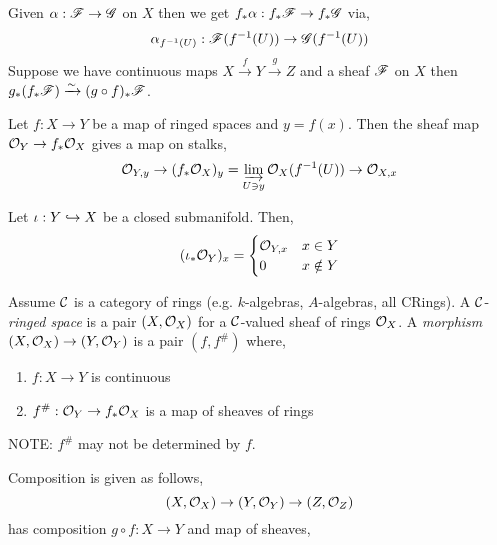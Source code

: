 \documentclass[12pt]{article}
\begin{document}
\begin{rmk}
Given $\alpha : \mathscr{F} \to \mathscr{G}$ on $X$ then we get $f_* \alpha : f_* \mathscr{F} \to f_* \mathscr{G}$ via,
\[ \alpha_{f^{-1}(U)} : \mathscr{F}(f^{-1}(U)) \to \mathscr{G}(f^{-1}(U)) \]
Suppose we have continuous maps $X \xrightarrow{f} Y \xrightarrow{g} Z$ and a sheaf $\mathscr{F}$ on $X$ then $g_* (f_* \mathscr{F}) \xrightarrow{\sim} (g \circ f)_* \mathscr{F}$.
\end{rmk}

\begin{example}
Let $f : X \to Y$ be a map of ringed spaces and $y = f(x)$. Then the sheaf map $\mathcal{O}_{Y} \to f_* \mathcal{O}_{X}$ gives a map on stalks,
\[ \mathcal{O}_{Y, y} \to (f_* \mathcal{O}_{X})_y = \varinjlim_{U \ni y} \mathcal{O}_{X}(f^{-1}(U)) \to \mathcal{O}_{X, x} \]
\end{example}

\begin{example}
Let $\iota : Y \hookrightarrow X$ be a closed submanifold. Then,
\[ (\iota_* \mathcal{O}_{Y})_x = 
\begin{cases}
\mathcal{O}_{Y, x} & x \in Y 
\\
0 & x \notin Y
\end{cases} \]
\end{example}

\begin{defn}
Assume $\mathcal{C}$ is a category of rings (e.g. $k$-algebras, $A$-algebras, all CRings). A $\mathcal{C}$-\textit{ringed space} is a pair $(X, \mathcal{O}_{X})$ for a $\mathcal{C}$-valued sheaf of rings $\mathcal{O}_{X}$. A \textit{morphism} $(X, \mathcal{O}_{X}) \to (Y, \mathcal{O}_{Y})$ is a pair $(f, f^\#)$ where,
\begin{enumerate}
\item $f : X \to Y$ is continuous
\item $f^\# : \mathcal{O}_{Y} \to f_* \mathcal{O}_{X}$ is a map of sheaves of rings
\end{enumerate}
\end{defn}

\begin{rmk}
NOTE: $f^\#$ may not be determined by $f$.
\end{rmk}

\begin{rmk}
Composition is given as follows,
\[ (X, \mathcal{O}_{X}) \to (Y, \mathcal{O}_{Y}) \to (Z, \mathcal{O}_{Z}) \]
has composition $g \circ f : X \to Y$ and map of sheaves,
\begin{center}
\end{center}
\end{rmk}
\end{document}
